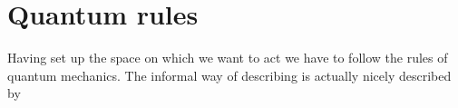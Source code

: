 \section{Quantum rules}
Having set up the space on which we want to act we have to follow the rules of quantum mechanics. The informal way of describing is actually nicely described by 